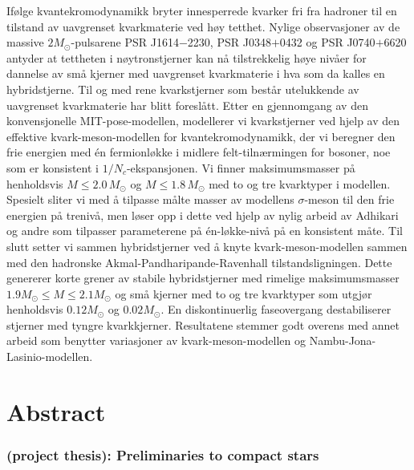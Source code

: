 Ifølge kvantekromodynamikk bryter innesperrede kvarker fri fra hadroner til en tilstand av uavgrenset kvarkmaterie ved høy tetthet.
Nylige observasjoner av de massive $2 M_\odot$-pulsarene PSR J1614$-$2230, PSR J0348$+$0432 og PSR J0740$+$6620
antyder at tettheten i nøytronstjerner kan nå tilstrekkelig høye nivåer for dannelse av små kjerner med uavgrenset kvarkmaterie
i hva som da kalles en hybridstjerne.
Til og med rene kvarkstjerner som består utelukkende av uavgrenset kvarkmaterie har blitt foreslått.
Etter en gjennomgang av den konvensjonelle MIT-pose-modellen,
modellerer vi kvarkstjerner ved hjelp av den effektive kvark-meson-modellen for kvantekromodynamikk,
der vi beregner den frie energien med én fermionløkke i midlere felt-tilnærmingen for bosoner, %
noe som er konsistent i $1/N_c$-ekspansjonen.
Vi finner maksimumsmasser på henholdsvis $M \leq 2.0 \, M_\odot$ og $M \leq 1.8 \, M_\odot$ med
to og tre kvarktyper i modellen.
Spesielt sliter vi med å tilpasse målte masser av modellens $\sigma$-meson til den frie energien på trenivå,
men løser opp i dette ved hjelp av nylig arbeid av Adhikari og andre
som tilpasser parameterene på én-løkke-nivå på en konsistent måte.
Til slutt setter vi sammen hybridstjerner ved å knyte kvark-meson-modellen
sammen med den hadronske Akmal-Pandharipande-Ravenhall tilstandsligningen.
Dette genererer korte grener av stabile hybridstjerner med rimelige maksimumsmasser $1.9 M_\odot \leq M \leq 2.1 M_\odot$
og små kjerner med to og tre kvarktyper som utgjør henholdsvis $0.12 M_\odot$ og $0.02 M_\odot$.
En diskontinuerlig faseovergang destabiliserer stjerner med tyngre kvarkkjerner.
Resultatene stemmer godt overens med annet arbeid
som benytter variasjoner av kvark-meson-modellen
og Nambu-Jona-Lasinio-modellen.%
\tikzexternaldisable%
%
\tikzexternalenable%

\chapter{Abstract}

\subsection*{ (project thesis): Preliminaries to compact stars}

